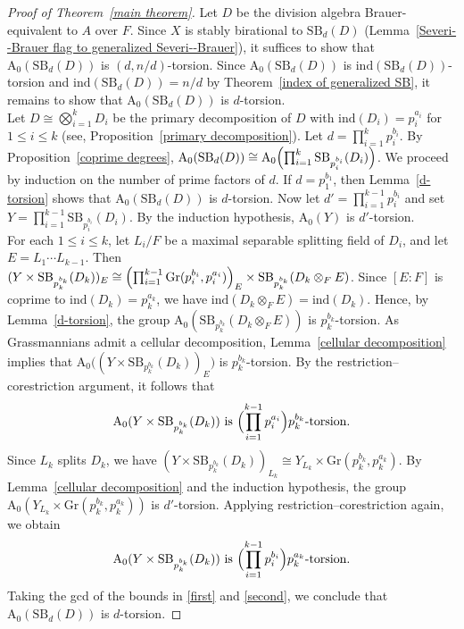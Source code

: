 \documentclass[10pt]{amsart}
\theoremstyle{plain}
\theoremstyle{definition}
\begin{document}
\begin{proof}[Proof of Theorem~\ref{main theorem}]
Let \(D\) be the division algebra Brauer-equivalent to \(A\) over \(F\). Since \(X\) is stably birational to \(\mathrm{SB}_d(D)\) (Lemma~\ref{Severi--Brauer flag to generalized Severi--Brauer}), it suffices to show that \(\mathrm{A_0}(\mathrm{SB}_d(D))\) is \((d,n/d)\)-torsion. Since \(\mathrm{A_0}(\mathrm{SB}_d(D))\) is \(\mathrm{ind}(\mathrm{SB}_d(D))\)-torsion and \(\mathrm{ind}(\mathrm{SB}_d(D))=n/d\) by Theorem~\ref{index of generalized SB}, it remains to show that \(\mathrm{A_0}(\mathrm{SB}_d(D))\) is \(d\)-torsion. \\
Let \(D \cong \bigotimes_{i=1}^k D_i\) be the primary decomposition of \(D\) with \(\mathrm{ind}(D_i)=p_i^{a_i}\) for \(1 \leq i \leq k\) (see, Proposition~\ref{primary decomposition}). Let \(d=\prod_{i=1}^k p_i^{b_i}\). By Proposition~\ref{coprime degrees}, \(\mathrm{A_0}(\mathrm{SB}_d(D)) \cong \mathrm{A_0}\Bigl(\prod_{i=1}^k \mathrm{SB}_{p_i^{b_i}}(D_i)\Bigr)\). We proceed by induction on the number of prime factors of \(d\). If \(d=p_1^{b_1}\), then Lemma~\ref{d-torsion} shows that \(\mathrm{A_0}(\mathrm{SB}_d(D))\) is \(d\)-torsion.
Now let \(d'=\prod_{i=1}^{k-1} p_i^{b_i}\) and set \(Y=\prod_{i=1}^{k-1} \mathrm{SB}_{p_i^{b_i}}(D_i)\). By the induction hypothesis, \(\mathrm{A_0}(Y)\) is \(d'\)-torsion.\\
For each \(1 \le i \le k\), let \(L_i/F\) be a maximal separable splitting field of \(D_i\), and let \(E=L_1\cdots L_{k-1}\). Then \((Y \times \mathrm{SB}_{p_k^{b_k}}(D_k))_E \cong \Bigl(\prod_{i=1}^{k-1} \mathrm{Gr}(p_i^{b_i},p_i^{a_i})\Bigr)_E \times \mathrm{SB}_{p_k^{b_k}}(D_k \otimes_F E)\). Since \([E:F]\) is coprime to \(\mathrm{ind}(D_k)=p_k^{a_k}\), we have \(\mathrm{ind}(D_k \otimes_F E)=\mathrm{ind}(D_k)\). Hence, by Lemma~\ref{d-torsion}, the group \(\mathrm{A_0}(\mathrm{SB}_{p_k^{b_k}}(D_k \otimes_F E))\) is \(p_k^{b_k}\)-torsion. As Grassmannians admit a cellular decomposition, Lemma~\ref{cellular decomposition} implies that \(\mathrm{A_0}\bigl((Y \times \mathrm{SB}_{p_k^{b_k}}(D_k))_E\bigr)\) is \(p_k^{b_k}\)-torsion. By the restriction--corestriction argument, it follows that
\begin{equation}\label{first}
\mathrm{A_0}(Y \times \mathrm{SB}_{p_k^{b_k}}(D_k)) \text{ is } \Bigl(\prod_{i=1}^{k-1} p_i^{a_i}\Bigr)p_k^{b_k}\text{-torsion}.
\end{equation}
Since \(L_k\) splits \(D_k\), we have \((Y \times \mathrm{SB}_{p_k^{b_k}}(D_k))_{L_k} \cong Y_{L_k} \times \mathrm{Gr}(p_k^{b_k},p_k^{a_k})\). By Lemma~\ref{cellular decomposition} and the induction hypothesis, the group \(\mathrm{A_0}(Y_{L_k} \times \mathrm{Gr}(p_k^{b_k},p_k^{a_k}))\) is \(d'\)-torsion. Applying restriction--corestriction again, we obtain
\begin{equation}\label{second}
\mathrm{A_0}(Y \times \mathrm{SB}_{p_k^{b_k}}(D_k)) \text{ is } \Bigl(\prod_{i=1}^{k-1} p_i^{b_i}\Bigr)p_k^{a_k}\text{-torsion}.
\end{equation}
Taking the gcd of the bounds in \eqref{first} and \eqref{second}, we conclude that \(\mathrm{A_0}(\mathrm{SB}_d(D))\) is \(d\)-torsion.
\end{proof}
\end{document}
